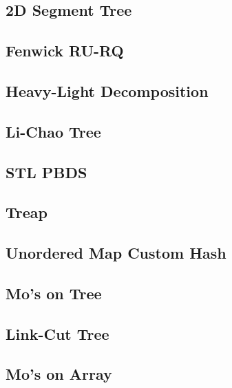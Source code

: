 \subsection{2D Segment Tree}

\subsection{Fenwick RU-RQ}

\subsection{Heavy-Light Decomposition}

\subsection{Li-Chao Tree}

\subsection{STL PBDS}

\subsection{Treap}

\subsection{Unordered Map Custom Hash}

\subsection{Mo's on Tree}

\subsection{Link-Cut Tree}

\subsection{Mo's on Array}

